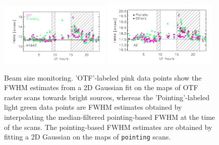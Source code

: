 \begin{figure}[ht!]
  \begin{center}
    \includegraphics[clip=true, trim={0.9cm, 0.5cm, 0.5cm, 0.5cm}, width=0.4725\textwidth]{Figures/Beam_monitoring_with_otfs_vs_ut_compare_pointings_1mm.pdf}
    \includegraphics[clip=true, trim={0.5cm, 0.5cm, 0.5cm, 0.5cm}, width=0.4875\textwidth]{Figures/Beam_monitoring_with_otfs_vs_ut_compare_pointings_a2.pdf}
    \caption[Beam size monitoring comparison]{Beam size monitoring.
     'OTF'-labeled pink data points show the FWHM estimates from a 2D
    Gaussian fit on the maps of OTF raster scans towards bright
    sources, whereas the 'Pointing'-labeled light green data points
    are FWHM estimates obtained by interpolating the {\lp
    median-filtered} pointing-based FWHM at the time of the
    scans. {\lp The
    pointing-based FWHM estimates are obtained by fitting a 2D Gaussian on the
    maps of {\tt pointing} scans.}}
\label{fig:beam_monitoring_compare}
\end{center}
\end{figure}

